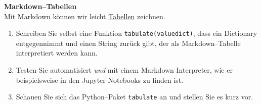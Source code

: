 \textbf{Markdown--Tabellen}\\
Mit Markdown können wir leicht \href{https://www.tablesgenerator.com/markdown_tables}{Tabellen} zeichnen. 
\begin{enumerate}
\item Schreiben Sie selbst eine Funktion \verb|tabulate(valuedict)|, dass ein Dictionary entgegennimmt und einen String zurück gibt, der als Markdown--Tabelle interpretiert werden kann.
\item Testen Sie automatisiert \textit{und} mit einem Markdown Interpreter, wie er beispielsweise in den Jupyter Notebooks zu finden ist.
\item Schauen Sie sich das Python--Paket \verb|tabulate| an und stellen Sie es kurz vor.
%
\end{enumerate}